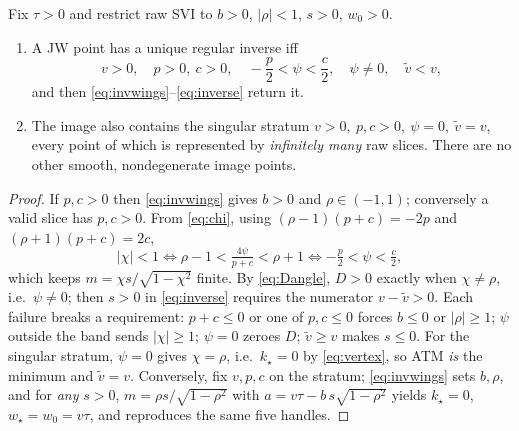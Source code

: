 \documentclass[11pt]{article}
\newcommand{\wmin}{w_\star}         %
\newcommand{\kmin}{k_\star}         %
\newcommand{\vmin}{\widetilde v}    %
\begin{document}
\begin{theorem}
\label{thm:image}
Fix $\tau>0$ and restrict raw SVI to $b>0$, $|\rho|<1$, $s>0$, $w_0>0$.
\begin{enumerate}[leftmargin=1.6em]
\item A JW point has a unique regular inverse iff
\begin{equation}
v>0,\quad p>0,\ c>0,\quad -\frac p2<\psi<\frac c2,\quad \psi\ne0,\quad \vmin<v,
\label{eq:regdom}
\end{equation}
and then \eqref{eq:invwings}--\eqref{eq:inverse} return it.
\item The image also contains the singular stratum
$v>0,\ p,c>0,\ \psi=0,\ \vmin=v$, every point of which is represented by
\emph{infinitely many} raw slices.  There are no other smooth, nondegenerate
image points.
\end{enumerate}
\end{theorem}

\begin{proof}
If $p,c>0$ then \eqref{eq:invwings} gives $b>0$ and $\rho\in(-1,1)$; conversely
a valid slice has $p,c>0$.  From \eqref{eq:chi}, using $(\rho-1)(p+c)=-2p$ and
$(\rho+1)(p+c)=2c$,
\[
|\chi|<1\iff \rho-1<\tfrac{4\psi}{p+c}<\rho+1\iff -\tfrac p2<\psi<\tfrac c2,
\]
which keeps $m=\chi s/\sqrt{1-\chi^2}$ finite.  By \eqref{eq:Dangle}, $D>0$
exactly when $\chi\ne\rho$, i.e.\ $\psi\ne0$; then $s>0$ in \eqref{eq:inverse}
requires the numerator $v-\vmin>0$.  Each failure breaks a requirement: $p+c\le0$
or one of $p,c\le0$ forces $b\le0$ or $|\rho|\ge1$; $\psi$ outside the band sends
$|\chi|\ge1$; $\psi=0$ zeroes $D$; $\vmin\ge v$ makes $s\le0$.  For the singular
stratum, $\psi=0$ gives $\chi=\rho$, i.e.\ $\kmin=0$ by \eqref{eq:vertex}, so ATM
\emph{is} the minimum and $\vmin=v$.  Conversely, fix $v,p,c$ on the stratum;
\eqref{eq:invwings} sets $b,\rho$, and for \emph{any} $s>0$,
$m=\rho s/\sqrt{1-\rho^2}$ with $a=v\tau-b\,s\sqrt{1-\rho^2}$ yields $\kmin=0$,
$\wmin=w_0=v\tau$, and reproduces the same five handles.
\end{proof}
\end{document}
